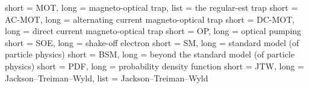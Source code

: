 % 
% 
% 

{
	short = MOT,
	long = magneto-optical trap,
	list = the regular-est trap
}
{
	short = AC-MOT,
	long = alternating current magneto-optical trap
}
{
	short = DC-MOT,
	long = direct current magneto-optical trap
}
{
	short = OP,
	long = optical pumping
}
{
	short = SOE,
	long = shake-off electron
}
{
	short = SM,
	long = standard model (of particle physics)
}
{
	short = BSM,
	long = beyond the standard model (of particle physics)
}
{
	short = PDF,
	long = probability density function
}
{
	short = JTW,
	long = Jackson--Treiman--Wyld,
	list = Jackson--Treiman--Wyld \cite{jtw}\cite{jtw_coulomb}
}
